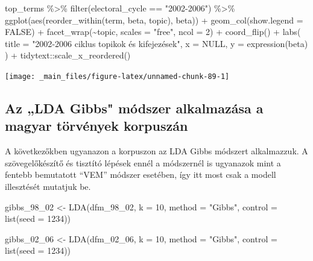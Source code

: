 \documentclass[
]{book}
\newenvironment{Shaded}{\begin{snugshade}}{\end{snugshade}}
\newcommand{\AttributeTok}[1]{\textcolor[rgb]{0.77,0.63,0.00}{#1}}
\newcommand{\ConstantTok}[1]{\textcolor[rgb]{0.00,0.00,0.00}{#1}}
\newcommand{\DecValTok}[1]{\textcolor[rgb]{0.00,0.00,0.81}{#1}}
\newcommand{\FunctionTok}[1]{\textcolor[rgb]{0.00,0.00,0.00}{#1}}
\newcommand{\NormalTok}[1]{#1}
\newcommand{\OtherTok}[1]{\textcolor[rgb]{0.56,0.35,0.01}{#1}}
\newcommand{\SpecialCharTok}[1]{\textcolor[rgb]{0.00,0.00,0.00}{#1}}
\newcommand{\StringTok}[1]{\textcolor[rgb]{0.31,0.60,0.02}{#1}}
\begin{document}
\begin{Shaded}
\begin{Highlighting}[]
\NormalTok{top\_terms }\SpecialCharTok{\%\textgreater{}\%}
  \FunctionTok{filter}\NormalTok{(electoral\_cycle }\SpecialCharTok{==} \StringTok{"2002{-}2006"}\NormalTok{) }\SpecialCharTok{\%\textgreater{}\%}
  \FunctionTok{ggplot}\NormalTok{(}\FunctionTok{aes}\NormalTok{(}\FunctionTok{reorder\_within}\NormalTok{(term, beta, topic), beta)) }\SpecialCharTok{+}
  \FunctionTok{geom\_col}\NormalTok{(}\AttributeTok{show.legend =} \ConstantTok{FALSE}\NormalTok{) }\SpecialCharTok{+}
  \FunctionTok{facet\_wrap}\NormalTok{(}\SpecialCharTok{\textasciitilde{}}\NormalTok{topic, }\AttributeTok{scales =} \StringTok{"free"}\NormalTok{, }\AttributeTok{ncol =} \DecValTok{2}\NormalTok{) }\SpecialCharTok{+}
  \FunctionTok{coord\_flip}\NormalTok{() }\SpecialCharTok{+}
  \FunctionTok{labs}\NormalTok{(}
    \AttributeTok{title =} \StringTok{"2002{-}2006 ciklus topikok és kifejezések"}\NormalTok{,}
    \AttributeTok{x =} \ConstantTok{NULL}\NormalTok{,}
    \AttributeTok{y =} \FunctionTok{expression}\NormalTok{(beta)}
\NormalTok{  ) }\SpecialCharTok{+}
\NormalTok{  tidytext}\SpecialCharTok{::}\FunctionTok{scale\_x\_reordered}\NormalTok{()}
\end{Highlighting}
\end{Shaded}

\begin{center}\texttt{[image: \_main\_files/figure-latex/unnamed-chunk-89-1]} \end{center}

\hypertarget{az-lda-gibbs-muxf3dszer-alkalmazuxe1sa-a-magyar-tuxf6rvuxe9nyek-korpuszuxe1n}{%
\subsection{Az „LDA Gibbs" módszer alkalmazása a magyar törvények
korpuszán}\label{az-lda-gibbs-muxf3dszer-alkalmazuxe1sa-a-magyar-tuxf6rvuxe9nyek-korpuszuxe1n}}

A következőkben ugyanazon a korpuszon az LDA Gibbs módszert alkalmazzuk.
A szövegelőkészítő és tisztító lépések ennél a módszernél is ugyanazok
mint a fentebb bemutatott ``VEM'' módszer esetében, így itt most csak a
modell illesztését mutatjuk be.

\begin{Shaded}
\begin{Highlighting}[]

\NormalTok{gibbs\_98\_02 }\OtherTok{\textless{}{-}} \FunctionTok{LDA}\NormalTok{(dfm\_98\_02, }\AttributeTok{k =} \DecValTok{10}\NormalTok{, }\AttributeTok{method =} \StringTok{"Gibbs"}\NormalTok{, }\AttributeTok{control =} \FunctionTok{list}\NormalTok{(}\AttributeTok{seed =} \DecValTok{1234}\NormalTok{))}

\NormalTok{gibbs\_02\_06 }\OtherTok{\textless{}{-}} \FunctionTok{LDA}\NormalTok{(dfm\_02\_06, }\AttributeTok{k =} \DecValTok{10}\NormalTok{, }\AttributeTok{method =} \StringTok{"Gibbs"}\NormalTok{, }\AttributeTok{control =} \FunctionTok{list}\NormalTok{(}\AttributeTok{seed =} \DecValTok{1234}\NormalTok{))}
\end{Highlighting}
\end{Shaded}
\end{document}
